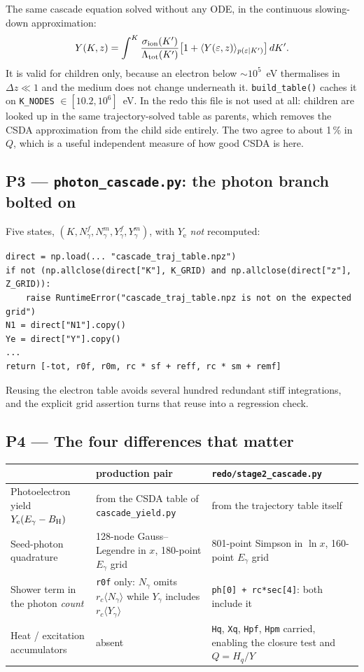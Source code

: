\documentclass[11pt,a4paper]{article}
\newcommand{\code}[1]{\texttt{\small #1}}
\newcommand{\file}[1]{\texttt{\small #1}}
\newcommand{\eps}{\varepsilon}
\newcommand{\Eg}{E_\gamma}
\newcommand{\BH}{B_{\mathrm{H}}}
\newcommand{\sion}{\sigma_{\mathrm{ion}}}
\begin{document}
The same cascade equation solved without any ODE, in the continuous
slowing-down approximation:
\[
  Y(K,z) = \int^{K} \frac{\sion(K')}{\Lambda_{\rm tot}(K')}
           \bigl[1 + \langle Y(\eps,z)\rangle_{p(\eps|K')}\bigr]\,dK' .
\]
It is valid for children only, because an electron below $\sim10^5$~eV
thermalises in $\Delta z \ll 1$ and the medium does not change underneath it.
\code{build\_table()} caches it on \code{K\_NODES} $\in[10.2, 10^6]$~eV.  In the
redo this file is not used at all: children are looked up in the same
trajectory-solved table as parents, which removes the CSDA approximation from
the child side entirely.  The two agree to about 1\,\% in $Q$, which is a
useful independent measure of how good CSDA is here.

\subsection*{P3 --- \file{photon\_cascade.py}: the photon branch bolted on}

Five states, $(K, N_\gamma^f, N_\gamma^m, Y_\gamma^f, Y_\gamma^m)$, with
$Y_{\mathrm e}$ \emph{not} recomputed:

\begin{lstlisting}
direct = np.load(... "cascade_traj_table.npz")
if not (np.allclose(direct["K"], K_GRID) and np.allclose(direct["z"], Z_GRID)):
    raise RuntimeError("cascade_traj_table.npz is not on the expected grid")
N1 = direct["N1"].copy()
Ye = direct["Y"].copy()
...
return [-tot, r0f, r0m, rc * sf + reff, rc * sm + remf]
\end{lstlisting}

Reusing the electron table avoids several hundred redundant stiff
integrations, and the explicit grid assertion turns that reuse into a
regression check.

\subsection*{P4 --- The four differences that matter}

\begin{center}
\begin{tabular}{p{4.6cm}p{4.6cm}p{5.6cm}}
\toprule
& production pair & \file{redo/stage2\_cascade.py} \\
\midrule
Photoelectron yield $Y_{\rm e}(\Eg-\BH)$
  & from the CSDA table of \file{cascade\_yield.py}
  & from the trajectory table itself \\[3pt]
Seed-photon quadrature
  & 128-node Gauss--Legendre in $x$, 180-point $\Eg$ grid
  & 801-point Simpson in $\ln x$, 160-point $\Eg$ grid \\[3pt]
Shower term in the photon \emph{count}
  & \code{r0f} only: $N_\gamma$ omits $r_c\langle N_\gamma\rangle$ while
    $Y_\gamma$ includes $r_c\langle Y_\gamma\rangle$
  & \code{ph[0] + rc*sec[4]}: both include it \\[3pt]
Heat / excitation accumulators
  & absent
  & \code{Hq}, \code{Xq}, \code{Hpf}, \code{Hpm} carried, enabling the closure
    test and $Q=H_q/Y$ \\
\bottomrule
\end{tabular}
\end{center}
\end{document}
